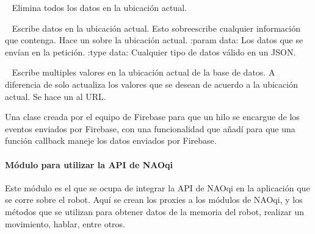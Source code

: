 
\begin{fulllineitems}
\label{\detokenize{nao_firebase:firebase.FirebaseDatabase.remove}}~
Elimina todos los datos en la ubicación actual.

\end{fulllineitems}


\begin{fulllineitems}
\label{\detokenize{nao_firebase:firebase.FirebaseDatabase.set}}~
Escribe datos en la ubicación actual. Esto sobreescribe cualquier información
que contenga.
Hace un  sobre la ubicación actual.
:param data: Los datos que se envían en la petición.
:type data: Cualquier tipo de datos válido en un JSON.

\end{fulllineitems}


\begin{fulllineitems}
\label{\detokenize{nao_firebase:firebase.FirebaseDatabase.update}}~
Escribe multiples valores en la ubicación actual de la base de datos. A diferencia
de {\hyperref[\detokenize{nao_firebase:firebase.FirebaseDatabase.set}]{}} solo actualiza los valores que se desean de acuerdo a la ubicación
actual. Se hace un  al URL.

\end{fulllineitems}


Una clase creada por el equipo de Firebase para que un hilo
se encargue de los eventos enviados por Firebase, con una
funcionalidad que añadí para que una función callback maneje
los datos enviados por Firebase.



\paragraph{Módulo para utilizar la API de NAOqi}
\label{\detokenize{nao_firebase:modulo-para-utiizar-modulos-de-naoqi}}
Este módulo es el que se ocupa de integrar la API de NAOqi en la aplicación
que se corre sobre el robot. Aquí se crean los proxies a los módulos de NAOqi,
y los métodos que se utilizan para obtener datos de la memoria del robot,
realizar un movimiento, hablar, entre otros.

